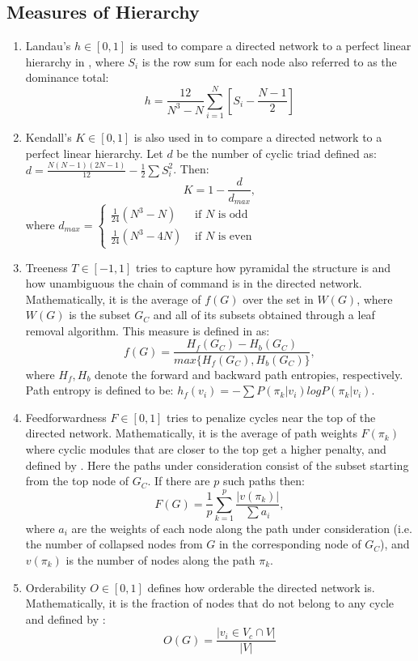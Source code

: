 \documentclass[3p,times]{elsarticle}
\begin{document}
\subsection{Measures of Hierarchy}
\begin{enumerate}
	\item Landau's $h\in[0,1]$ is used to compare a directed network to a perfect linear hierarchy in \cite{animals}, where $S_i$ is the row sum for each node also referred to as the dominance total: 
	$$
	h=\frac{12}{N^3-N}\sum_{i=1}^{N}{[S_i-\frac{N-1}{2}]}
	$$
	\item Kendall's $K\in[0,1]$ is also used in \cite{animals} to compare a directed network to a perfect linear hierarchy. Let $d$ be the number of cyclic triad defined as: $d=\frac{N(N-1)(2N-1)}{12}-\frac{1}{2}\sum{S_i^2}$. Then: 
	$$
	K=1-\frac{d}{d_{max}},
	$$ 
	where $d_{max} = \left\{ \begin{array}{rl}
	\frac{1}{24}(N^3-N)&\mbox{ if $N$ is odd} \\
	\frac{1}{24}(N^3-4N)&\mbox{ if $N$ is even}
	\end{array} \right.$
	
	\item Treeness $T\in[-1,1]$ tries to capture how pyramidal the structure is and how unambiguous the chain of command is in the directed network. Mathematically, it is the average of $f(G)$ over the set in $W(G)$, where $W(G)$ is the subset $G_C$ and all of its subsets obtained through a leaf removal algorithm. This measure is defined in \cite{3D} as:
	$$
	f(G)=\frac{H_f(G_C)-H_b(G_C)}{max\{H_f(G_C),H_b(G_C)\}},
	$$
	where $H_f, H_b$ denote the forward and backward path entropies, respectively. Path entropy is defined to be:  $h_f(v_i)=-\sum{P(\pi_k|v_i)logP(\pi_k|v_i)}$.  
	
	\item Feedforwardness $F\in[0,1]$ tries to penalize cycles near the top of the directed network. Mathematically, it is the average of path weights $F(\pi_k)$ where cyclic modules that are closer to the top get a higher penalty, and defined by \cite{3D}. Here the paths under consideration consist of the subset starting from the top node of $G_C$. If there are $p$ such paths then:
	$$
	F(G)=\frac{1}{p}\sum_{k=1}^{p}{\frac{|v(\pi_k)|}{\sum{a_i}}},
	$$
	where $a_i$ are the weights of each node along the path under consideration (i.e. the number of collapsed nodes from $G$ in the corresponding node of $G_C$), and $v(\pi_k)$ is the number of nodes along the path $\pi_k$.
	
	\item Orderability $O\in[0,1]$ defines how orderable the directed network is. Mathematically, it is the fraction of nodes that do not belong to any cycle and defined by \cite{3D}:
	$$
	O(G)=\frac{|v_i\in V_c\cap V|}{|V|}
	$$
	

\end{enumerate}
\end{document}
